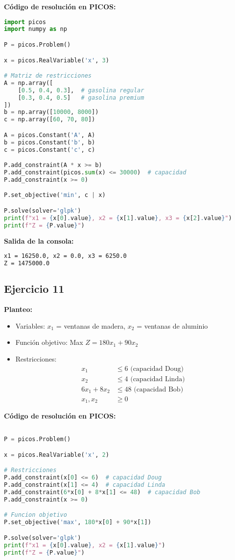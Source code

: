 \documentclass[12pt]{article}
\begin{document}
\textbf{Código de resolución en PICOS:}
\begin{lstlisting}[language=Python]
import picos
import numpy as np

P = picos.Problem()

x = picos.RealVariable('x', 3)

# Matriz de restricciones
A = np.array([
    [0.5, 0.4, 0.3],  # gasolina regular
    [0.3, 0.4, 0.5]   # gasolina premium
])
b = np.array([10000, 8000])
c = np.array([60, 70, 80])

A = picos.Constant('A', A)
b = picos.Constant('b', b)
c = picos.Constant('c', c)

P.add_constraint(A * x >= b)
P.add_constraint(picos.sum(x) <= 30000)  # capacidad
P.add_constraint(x >= 0)

P.set_objective('min', c | x)

P.solve(solver='glpk')
print(f"x1 = {x[0].value}, x2 = {x[1].value}, x3 = {x[2].value}")
print(f"Z = {P.value}")
\end{lstlisting}

\textbf{Salida de la consola:}
\begin{lstlisting}[language=bash,backgroundcolor=\color{black},basicstyle=\color{white}\ttfamily,numbers=none]
x1 = 16250.0, x2 = 0.0, x3 = 6250.0
Z = 1475000.0
\end{lstlisting}

\subsection*{Ejercicio 11}

\textbf{Planteo:}
\begin{itemize}
\item Variables: $x_1$ = ventanas de madera, $x_2$ = ventanas de aluminio
\item Función objetivo: Max $Z = 180x_1 + 90x_2$
\item Restricciones:
  \begin{align*}
  x_1 &\leq 6 \text{ (capacidad Doug)} \\
  x_2 &\leq 4 \text{ (capacidad Linda)} \\
  6x_1 + 8x_2 &\leq 48 \text{ (capacidad Bob)} \\
  x_1, x_2 &\geq 0
  \end{align*}
\end{itemize}

\textbf{Código de resolución en PICOS:}
\begin{lstlisting}[language=Python]

P = picos.Problem()

x = picos.RealVariable('x', 2)

# Restricciones
P.add_constraint(x[0] <= 6)  # capacidad Doug
P.add_constraint(x[1] <= 4)  # capacidad Linda
P.add_constraint(6*x[0] + 8*x[1] <= 48)  # capacidad Bob
P.add_constraint(x >= 0)

# Funcion objetivo
P.set_objective('max', 180*x[0] + 90*x[1])

P.solve(solver='glpk')
print(f"x1 = {x[0].value}, x2 = {x[1].value}")
print(f"Z = {P.value}")
\end{lstlisting}
\end{document}
